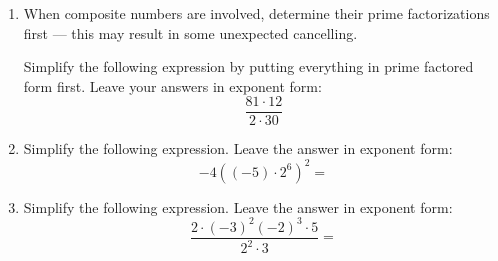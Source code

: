 \documentclass[letterpaper,12pt,fleqn]{article}
\begin{document}
\begin{enumerate}
\item When composite numbers are involved, determine their prime
  factorizations first --- this may result in some unexpected cancelling.

  Simplify the following expression by putting everything in prime factored
  form first. Leave your answers in exponent form:
  \[\frac{81\cdot12}{2\cdot30}\]

\item Simplify the following expression. Leave the answer in exponent form:
  \[-4((-5)\cdot2^6)^2=\]

\item Simplify the following expression. Leave the answer in exponent form:
  \[\frac{2\cdot(-3)^2(-2)^3\cdot5}{2^2\cdot3}=\]

\end{enumerate}
\end{document}
